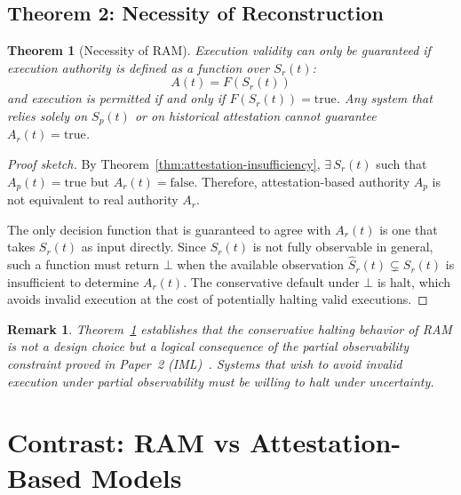 \documentclass[11pt]{article}
\newtheorem{theorem}{Theorem}[section]
\newtheorem{remark}{Remark}[section]
\newcommand{\Sr}{S_r}
\newcommand{\Sp}{S_p}
\newcommand{\Ar}{A_r}
\newcommand{\Ap}{A_p}
\newcommand{\St}[1]{S_r(#1)}
\newcommand{\Ndefval}{\bot}
\begin{document}
\subsection{Theorem 2: Necessity of Reconstruction}

\begin{theorem}[Necessity of RAM]
\label{thm:necessity}
Execution validity can only be guaranteed if execution authority is defined
as a function over $\Sr(t)$:
\[
A(t) = F\!\left(\St{t}\right)
\]
and execution is permitted if and only if $F(\St{t}) = \text{true}$.
Any system that relies solely on $\Sp(t)$ or on historical attestation
cannot guarantee $\Ar(t) = \text{true}$.
\end{theorem}

\begin{proof}[Proof sketch]
By Theorem~\ref{thm:attestation-insufficiency}, $\exists\, \Sr(t)$ such that
$\Ap(t) = \text{true}$ but $\Ar(t) = \text{false}$.
Therefore, attestation-based authority $\Ap$ is not equivalent to real
authority $\Ar$.

The only decision function that is guaranteed to agree with $\Ar(t)$ is one
that takes $\Sr(t)$ as input directly.
Since $\Sr(t)$ is not fully observable in general, such a function must
return $\Ndefval$ when the available observation $\hat{S}_r(t) \subsetneq \Sr(t)$
is insufficient to determine $\Ar(t)$.
The conservative default under $\Ndefval$ is halt, which avoids invalid execution
at the cost of potentially halting valid executions.
\end{proof}

\begin{remark}
Theorem~\ref{thm:necessity} establishes that the conservative halting behavior
of RAM is not a design choice but a logical consequence of the partial
observability constraint proved in Paper~2 (IML)~\cite{fernandez2026c}.
Systems that wish to avoid invalid execution under partial observability
\emph{must} be willing to halt under uncertainty.
\end{remark}

\section{Contrast: RAM vs Attestation-Based Models}
\label{sec:contrast}
\end{document}
